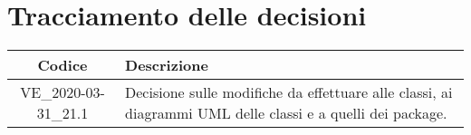 \section*{Tracciamento delle decisioni}

\begin{center}
	\begin{longtable}{|c|p{12.25cm}|}
	\hline
	\rowcolor{lighter-grayer}
	\textbf{Codice} & \textbf{Descrizione} \\
	\hline
	\endfirsthead

	\hline
	VE\_2020-03-31\_21.1 & Decisione sulle modifiche da effettuare alle classi, ai diagrammi UML delle classi e a quelli dei package. \\
	\hline

	\end{longtable}
\end{center}
